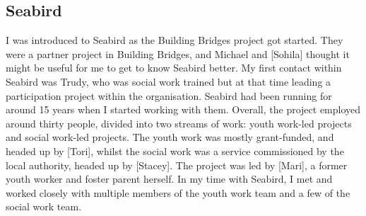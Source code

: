 



\subsection{Seabird}
I was introduced to Seabird as the Building Bridges project got started. They were a partner project in Building Bridges, and Michael and [Sohila] thought it might be useful for me to get to know Seabird better. My first contact within Seabird was Trudy, who was social work trained but at that time leading a participation project within the organisation. Seabird had been running for around 15 years when I started working with them. Overall, the project employed around thirty people, divided into two streams of work: youth work-led projects and social work-led projects. The youth work was mostly grant-funded, and headed up by [Tori], whilst the social work was a service commissioned by the local authority, headed up by [Stacey]. The project was led by [Mari], a former youth worker and foster parent herself. In my time with Seabird, I met and worked closely with multiple members of the youth work team and a few of the social work team. 

